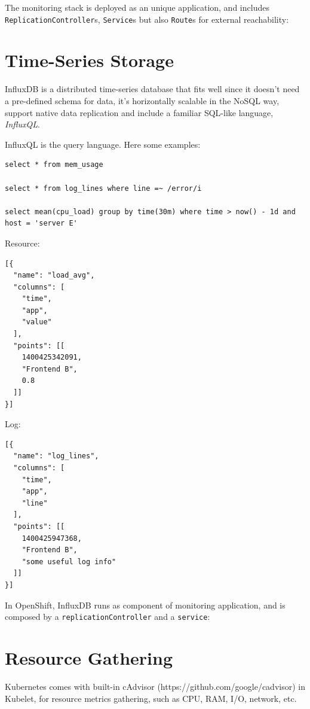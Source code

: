 The monitoring stack is deployed as an unique application, and includes
\texttt{ReplicationController}s, \texttt{Service}s but also
\texttt{Route}s for external reachability:

\section{Time-Series Storage}\label{time-series-storage}

InfluxDB is a distributed time-series database that fits well since it
doesn't need a pre-defined schema for data, it's horizontally scalable
in the NoSQL way, support native data replication and include a familiar
SQL-like language, \emph{InfluxQL}.

InfluxQL is the query language. Here some examples:

\begin{verbatim}
select * from mem_usage

select * from log_lines where line =~ /error/i

select mean(cpu_load) group by time(30m) where time > now() - 1d and host = 'server E'
\end{verbatim}

Resource:

\begin{verbatim}
[{
  "name": "load_avg",
  "columns": [
    "time",
    "app",
    "value"
  ],
  "points": [[
    1400425342091,
    "Frontend B",
    0.8
  ]]
}]
\end{verbatim}

Log:

\begin{verbatim}
[{
  "name": "log_lines",
  "columns": [
    "time",
    "app",
    "line"
  ],
  "points": [[
    1400425947368,
    "Frontend B",
    "some useful log info"
  ]]
}]
\end{verbatim}

In OpenShift, InfluxDB runs as component of monitoring application, and
is composed by a \texttt{replicationController} and a \texttt{service}:

\section{Resource Gathering}\label{resource-gathering}

Kubernetes comes with built-in cAdvisor
(https://github.com/google/cadvisor) in Kubelet, for resource metrics
gathering, such as CPU, RAM, I/O, network, etc.

